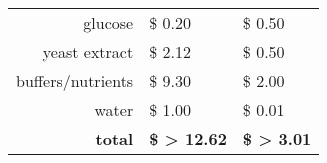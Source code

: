 \begin{tabular}{rP{3cm}P{3cm}}
  \toprule
     &
     &
     \\
  \midrule
    glucose
      & \$ 0.20
      & \$ 0.50 \\
    yeast extract
      & \$ 2.12
      & \$ 0.50 \\
    buffers/nutrients
      & \$ 9.30
      & \$ 2.00 \\
    water
      & \$ 1.00
      & \$ 0.01 \\
    \textbf{total}
      & \textbf{\$ > 12.62}
      & \textbf{\$ > 3.01} \\
  \bottomrule
\end{tabular}
